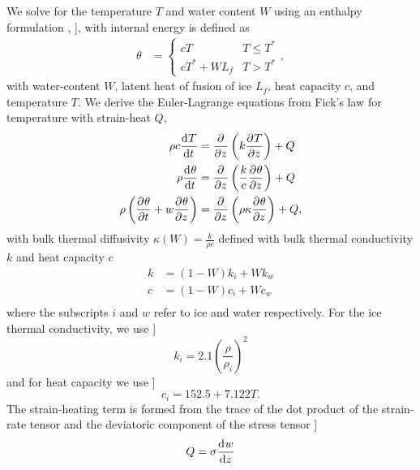 We solve for the temperature $T$ and water content $W$ using an enthalpy formulation \citep{greve_2009}, \citet{aschwanden_2012}], with internal energy is defined as
\begin{align*}
  \theta &= 
  \begin{cases}
    c T                & T \leq T^* \\
    c T^* + W L_f & T > T^*
  \end{cases},
\end{align*}
with water-content $W$, latent heat of fusion of ice $L_f$, heat capacity $c$, and temperature $T$.  We derive the Euler-Lagrange equations from Fick's law for temperature with strain-heat $Q$,
\begin{align*}
  \rho c \frac{\mathrm{d}^{} T}{\mathrm{d} t^{} } &= \frac{\partial^{} }{\partial z^{} } \left( k \frac{\partial^{} T}{\partial z^{} } \right) + Q \\
  \rho \frac{\mathrm{d}^{} \theta}{\mathrm{d} t^{} } &= \frac{\partial^{} }{\partial z^{} } \left( \frac{k}{c} \frac{\partial^{} \theta}{\partial z^{} } \right) + Q \\
  \rho \left( \frac{\partial^{} \theta}{\partial t^{} } + w \frac{\partial^{} \theta}{\partial z^{} } \right) &= \frac{\partial^{} }{\partial z^{} } \left( \rho \kappa \frac{\partial^{} \theta}{\partial z^{} } \right) + Q,
\end{align*}
with bulk thermal diffusivity $\kappa(W) = \frac{k}{\rho c}$ defined with bulk thermal conductivity $k$ and heat capacity $c$
\begin{align*}
  k &= (1-W) k_i + W k_w \\
  c &= (1-W) c_i + W c_w \\
\end{align*}
where the subscripts $i$ and $w$ refer to ice and water respectively.  For the ice thermal conductivity, we use \citep{arthern_2010}]
$$k_i = 2.1 \left(\frac{\rho}{\rho_i}\right)^2$$
and for heat capacity we use \citep{paterson_1994}]
$$c_i = 152.5 + 7.122T.$$
The strain-heating term is formed from the trace of the dot product of the strain-rate tensor and the deviatoric component of the stress tensor \citep{greve_2009}]
$$Q = \sigma \frac{\mathrm{d}^{} w}{\mathrm{d} z^{} }$$

